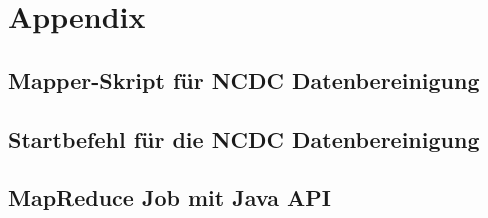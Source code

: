 \chapter{Appendix}

\section{Mapper-Skript für NCDC Datenbereinigung}\label{appendix lst:ncdc concatenate script}


\section{Startbefehl für die NCDC Datenbereinigung}\label{appendix lst:ncdc concatenate start script}


\section{MapReduce Job mit Java API}\label{appendix lst:mr java api}
